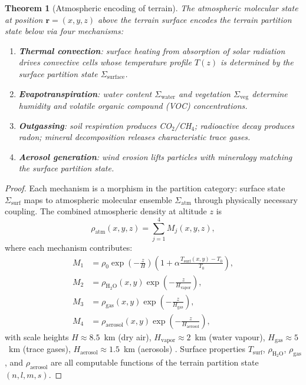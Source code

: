 \documentclass[10pt,twocolumn]{article}
\newtheorem{theorem}{Theorem}[section]
\theoremstyle{definition}
\theoremstyle{remark}
\begin{document}
\begin{theorem}[Atmospheric encoding of terrain]
\label{thm:encoding}
The atmospheric molecular state at position
$\mathbf{r}=(x,y,z)$ above the terrain surface encodes the
terrain partition state below via four mechanisms:
\begin{enumerate}[label=(\roman*),leftmargin=*,itemsep=1pt]
\item \textbf{Thermal convection}: surface heating from
  absorption of solar radiation drives convective cells
  whose temperature profile $T(z)$ is determined by the
  surface partition state $\Sigma_{\mathrm{surface}}$.
\item \textbf{Evapotranspiration}: water content
  $\Sigma_{\mathrm{water}}$ and vegetation
  $\Sigma_{\mathrm{veg}}$ determine humidity and volatile
  organic compound (VOC) concentrations.
\item \textbf{Outgassing}: soil respiration produces
  CO$_2$/CH$_4$; radioactive decay produces radon; mineral
  decomposition releases characteristic trace gases.
\item \textbf{Aerosol generation}: wind erosion lifts particles
  with mineralogy matching the surface partition state.
\end{enumerate}
\end{theorem}

\begin{proof}
Each mechanism is a morphism in the partition category:
surface state $\Sigma_{\mathrm{surf}}$ maps to atmospheric
molecular ensemble $\Sigma_{\mathrm{atm}}$ through physically
necessary coupling.  The combined atmospheric density at
altitude $z$ is
\begin{equation}\label{eq:rho_atm}
  \rho_{\mathrm{atm}}(x,y,z)
  = \sum_{j=1}^{4}M_j(x,y,z),
\end{equation}
where each mechanism contributes:
\begin{align}
  M_1 &= \rho_0\exp\!\left(-\frac{z}{H}\right)
    \left(1+\alpha\frac{T_{\mathrm{surf}}(x,y)-T_0}{T_0}\right),
    \label{eq:M1}\\
  M_2 &= \rho_{\mathrm{H_2O}}(x,y)
    \exp\!\left(-\frac{z}{H_{\mathrm{vapor}}}\right),
    \label{eq:M2}\\
  M_3 &= \rho_{\mathrm{gas}}(x,y)
    \exp\!\left(-\frac{z}{H_{\mathrm{gas}}}\right),
    \label{eq:M3}\\
  M_4 &= \rho_{\mathrm{aerosol}}(x,y)
    \exp\!\left(-\frac{z}{H_{\mathrm{aerosol}}}\right),
    \label{eq:M4}
\end{align}
with scale heights $H\approx 8.5$~km (dry air),
$H_{\mathrm{vapor}}\approx 2$~km (water vapour),
$H_{\mathrm{gas}}\approx 5$~km (trace gases),
$H_{\mathrm{aerosol}}\approx 1.5$~km (aerosols)
\citep{Wallace2006,Liou2002}.  Surface properties
$T_{\mathrm{surf}}$, $\rho_{\mathrm{H_2O}}$,
$\rho_{\mathrm{gas}}$, and $\rho_{\mathrm{aerosol}}$ are all
computable functions of the terrain partition state
$(n,l,m,s)$.
\end{proof}
\end{document}
